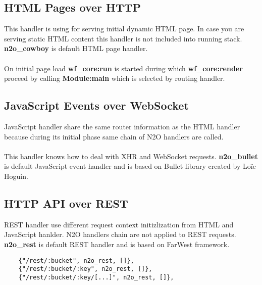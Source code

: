 \subsection{HTML Pages over HTTP}
This handler is using for serving initial dynamic HTML page.
In case you are serving static HTML content this handler is
not included into running stack. {\bf {n2o}\_{cowboy}} is
default HTML page handler.

\paragraph{}
On initial page load {\bf {wf}\_{core}:run} is started during
which {\bf {wf}\_{core}:render} proceed by calling {\bf Module:main} which
is selected by routing handler.

\subsection{JavaScript Events over WebSocket}
JavaScript handler share the same router information as the
HTML handler because during its initial phase same chain
of N2O handlers are called.

\paragraph{}
This handler knows how to deal with XHR and WebSocket requests.
{\bf {n2o}\_{bullet}} is default JavaScript event handler
and is based on Bullet library created by Loïc Hoguin.

\newpage
\subsection{HTTP API over REST}
REST handler use different request context initizlization
from HTML and JavaScript hanlder. N2O handlers chain are not
applied to REST requests. {\bf {n2o}\_{rest}} is default REST
handler and is based on FarWest framework.

\vspace{1\baselineskip}
\begin{lstlisting}
    {"/rest/:bucket", n2o_rest, []},
    {"/rest/:bucket/:key", n2o_rest, []},
    {"/rest/:bucket/:key/[...]", n2o_rest, []},
\end{lstlisting}

